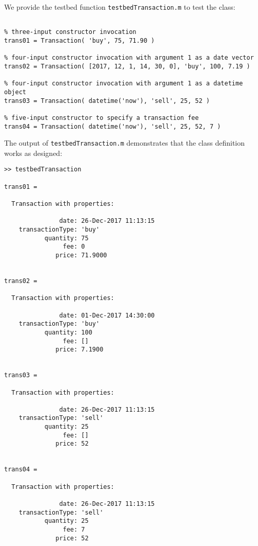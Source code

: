 We provide the testbed function \texttt{testbedTransaction.m} to test the class:
\begin{lstlisting}[style=Matlab-editor]
% testbedTransaction.m

% three-input constructor invocation
trans01 = Transaction( 'buy', 75, 71.90 )

% four-input constructor invocation with argument 1 as a date vector
trans02 = Transaction( [2017, 12, 1, 14, 30, 0], 'buy', 100, 7.19 )

% four-input constructor invocation with argument 1 as a datetime object
trans03 = Transaction( datetime('now'), 'sell', 25, 52 )

% five-input constructor to specify a transaction fee
trans04 = Transaction( datetime('now'), 'sell', 25, 52, 7 )
\end{lstlisting}
The output of \texttt{testbedTransaction.m} demonstrates that the class definition works as designed:
\begin{lstlisting}[style=Matlab-editor]
>> testbedTransaction

trans01 = 

  Transaction with properties:

               date: 26-Dec-2017 11:13:15
    transactionType: 'buy'
           quantity: 75
                fee: 0
              price: 71.9000


trans02 = 

  Transaction with properties:

               date: 01-Dec-2017 14:30:00
    transactionType: 'buy'
           quantity: 100
                fee: []
              price: 7.1900


trans03 = 

  Transaction with properties:

               date: 26-Dec-2017 11:13:15
    transactionType: 'sell'
           quantity: 25
                fee: []
              price: 52


trans04 = 

  Transaction with properties:

               date: 26-Dec-2017 11:13:15
    transactionType: 'sell'
           quantity: 25
                fee: 7
              price: 52
\end{lstlisting}

